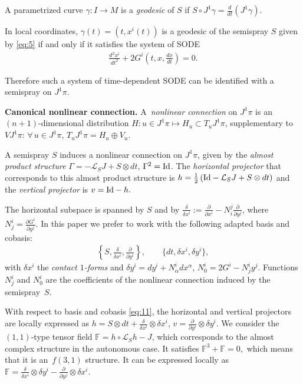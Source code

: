 \documentclass[pdftex]{sigma}
\begin{document}
A parametrized curve $\gamma:  I\rightarrow M$ is a \emph{geodesic}
of $S$ if $S\circ J^{1}\gamma=\frac{d}{dt}(J^{1}\gamma).$

In local coordinates, $\gamma(t)=(t,x^{i}(t))$ is a geodesic of the
semispray $S$ given by \eqref{eq:5} if and only if it satisf\/ies
the system of SODE \begin{gather}
\frac{d^{2}x^{i}}{dt^{2}}+2G^{i}\left(t,x,\frac{dx}{dt}\right)=0.\label{sode}
\end{gather}


Therefore such a system of time-dependent SODE can be identif\/ied with
a semispray on $J^{1}\pi$.

{\bf Canonical nonlinear connection.}
A~\emph{nonlinear connection} on $J^{1}\pi$ is an $(n+1)$-dimensional
distribution $H:u\in J^{1}\pi\mapsto H_{u}\subset T_{u}J^{1}\pi$,
supplementary to $VJ^{1}\pi$: $\forall\, u\in J^{1}\pi$, $T_{u}J^{1}\pi=H_{u}\oplus V_{u}$.

A semispray $S$ induces a nonlinear connection on $J^{1}\pi$, given
by the \emph{almost product structure} $\Gamma=-\mathcal{L}_{S}J+S\otimes dt$, $\Gamma^{2}={\rm Id}$.
The \emph{horizontal projector} that corresponds to this almost product
structure is $h=\frac{1}{2}\left({\rm Id}-\mathcal{L}_{S}J+S\otimes dt\right)$
and the \emph{vertical projector} is $v={\rm Id}-h.$

The horizontal subspace is spanned by $S$ and by $\frac{\delta}{\delta x^{i}}:=\frac{\partial}{\partial x^{i}}-N_{i}^{j}\frac{\partial}{\partial y^{j}}$, where $N_{j}^{i}=\frac{\partial G^{i}}{\partial y^{j}}$.
In this paper we prefer to work with the following adapted basis and
cobasis:
\begin{gather}
\left\{ S,\frac{\delta}{\delta x^{i}},\frac{\partial}{\partial y^{i}}\right\} ,\qquad\{dt,\delta x^{i},\delta y^{i}\},\label{eq:11}
\end{gather}
 with $\delta x^{i}$ the \emph{contact $1$-forms} and $\delta y^{i}=dy^{i}+N_{\alpha}^{i}dx^{\alpha}$, $N_{0}^{i}=2G^{i}-N_{j}^{i}y^{j}$.
Functions $N_{j}^{i}$ and $N_{0}^{i}$ are the coef\/f\/icients of the
nonlinear connection induced by the semispray~$S$.

With respect to basis and cobasis \eqref{eq:11}, the horizontal and
vertical projectors are locally expressed as $h=S\otimes dt+\frac{\delta}{\delta x^{i}}\otimes\delta x^{i}$, $v=\frac{\partial}{\partial y^{i}}\otimes\delta y^{i}$.
We consider the $(1,1)$-type tensor f\/ield $\mathbb{F}=h\circ\mathcal{L}_{S}h-J$,
which corresponds to the almost complex structure in the autonomous
case. It satisf\/ies $\mathbb{F}^{3}+\mathbb{F}=0,$ which means that
it is an~$f(3,1)$ structure. It can be expressed locally as $\mathbb{F}=\frac{\delta}{\delta x^{i}}\otimes\delta y^{i}-\frac{\partial}{\partial y^{j}}\otimes\delta x^{i}$.
\end{document}
